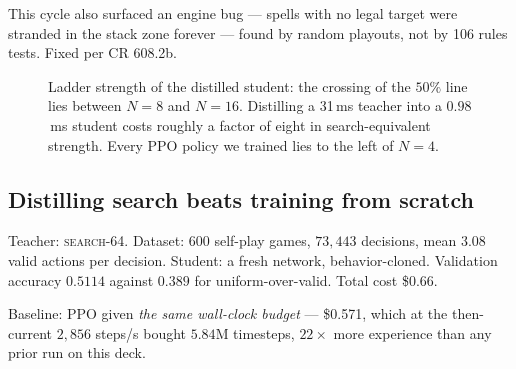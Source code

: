 \documentclass[11pt]{article}
\newcommand{\searchn}[1]{\textsc{search}-#1}
\begin{document}
This cycle also surfaced an engine bug --- spells with no legal target were stranded in the stack zone forever --- found by random playouts, not by 106 rules tests. Fixed per CR 608.2b.

\begin{figure}[t]
\centering
{}
\caption{Ladder strength of the distilled student: the crossing of the $50\%$ line lies between $N=8$ and $N=16$. Distilling a 31\,ms teacher into a $0.98$\,ms student costs roughly a factor of eight in search-equivalent strength. Every PPO policy we trained lies to the left of $N=4$.}
\label{fig:ladder}
\end{figure}

\subsection{Distilling search beats training from scratch}
\label{sec:distill}

Teacher: \searchn{64}. Dataset: 600 self-play games, $73{,}443$ decisions, mean $3.08$ valid actions per decision. Student: a fresh network, behavior-cloned. Validation accuracy $0.5114$ against $0.389$ for uniform-over-valid. Total cost \$0.66.

Baseline: PPO given \emph{the same wall-clock budget} --- \$0.571, which at the then-current $2{,}856$ steps/s bought $5.84$M timesteps, $22\times$ more experience than any prior run on this deck.
\end{document}
